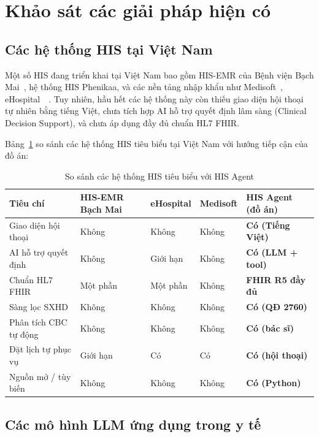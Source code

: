 \documentclass[a4paper,13pt,3p,oneside]{report}
\theoremstyle{definition}
\theoremstyle{remark}
\theoremstyle{definition}
\begin{document}
\section{Khảo sát các giải pháp hiện có}

\subsection{Các hệ thống HIS tại Việt Nam}

Một số HIS đang triển khai tại Việt Nam bao gồm HIS-EMR của Bệnh viện Bạch Mai~\cite{his-bachmai}, hệ thống HIS Phenikaa, và các nền tảng nhập khẩu như Medisoft~\cite{medisoft}, eHospital~\cite{ehospital}~\cite{his-vn}. Tuy nhiên, hầu hết các hệ thống này còn thiếu giao diện hội thoại tự nhiên bằng tiếng Việt, chưa tích hợp AI hỗ trợ quyết định lâm sàng (Clinical Decision Support), và chưa áp dụng đầy đủ chuẩn HL7 FHIR.

Bảng~\ref{tab:his-compare} so sánh các hệ thống HIS tiêu biểu tại Việt Nam với hướng tiếp cận của đồ án:

\begin{table}[H]
\centering
\begin{tabular}{|p{3.2cm}|p{2.2cm}|p{2.2cm}|p{2.2cm}|p{2.2cm}|}
\hline
\textbf{Tiêu chí} & \textbf{HIS-EMR Bạch Mai} & \textbf{eHospital} & \textbf{Medisoft} & \textbf{HIS Agent (đồ án)} \\
\hline
Giao diện hội thoại & Không & Không & Không & \textbf{Có (Tiếng Việt)} \\
\hline
AI hỗ trợ quyết định & Không & Giới hạn & Không & \textbf{Có (LLM + tool)} \\
\hline
Chuẩn HL7 FHIR & Một phần & Một phần & Không & \textbf{FHIR R5 đầy đủ} \\
\hline
Sàng lọc SXHD & Không & Không & Không & \textbf{Có (QĐ 2760)} \\
\hline
Phân tích CBC tự động & Không & Không & Không & \textbf{Có (bác sĩ)} \\
\hline
Đặt lịch tự phục vụ & Giới hạn & Có & Có & \textbf{Có (hội thoại)} \\
\hline
Nguồn mở / tùy biến & Không & Không & Không & \textbf{Có (Python)} \\
\hline
\end{tabular}
\caption{So sánh các hệ thống HIS tiêu biểu với HIS Agent}
\label{tab:his-compare}
\end{table}

\subsection{Các mô hình LLM ứng dụng trong y tế}
\end{document}
